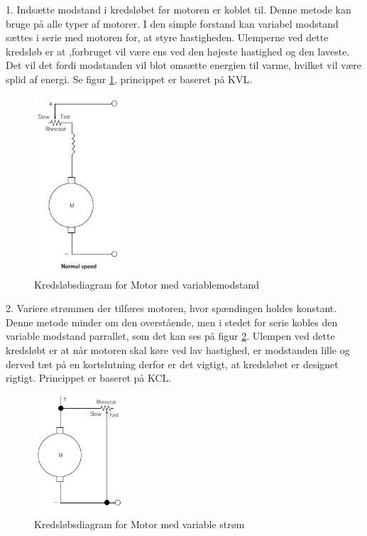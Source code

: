 1. Indsætte modstand i kredsløbet før motoren er koblet til.
Denne metode kan bruge på alle typer af motorer. I den simple forstand kan variabel modstand sættes i serie med motoren for, at styre hastigheden. Ulemperne ved dette kredsløb er at ,forbruget vil være ens ved den højeste hastighed og den laveste. Det vil det fordi modstanden vil blot omsætte energien til varme, hvilket vil være splid af energi. Se figur \ref{fig:motormodstand}, princippet er baseret på KVL.

\begin{figure}[H]
	\centering
	\includegraphics[width=0.3\textwidth]{billeder/Hardware/motormodstand.jpg}
	\caption{Kredsløbsdiagram for Motor med variablemodstand}
	\label{fig:motormodstand}
\end{figure}

2. Variere strømmen der tilføres motoren, hvor spændingen holdes konstant.
Denne metode minder om den overstående, men i stedet for serie kobles den variable modstand parrallet, som det kan ses på figur \ref{fig:motorcurrent}. Ulempen ved dette kredsløbt er at når motoren skal køre ved lav hastighed, er modstanden lille og derved tæt på en kortslutning derfor er det vigtigt, at kredsløbet er designet rigtigt. Princippet er baseret på KCL.

\begin{figure}[H]
	\centering
	\includegraphics[width=0.3\textwidth]{billeder/Hardware/motorcurrent.jpg}
	\caption{Kredsløbsdiagram for Motor med variable strøm}
	\label{fig:motorcurrent}
\end{figure}

